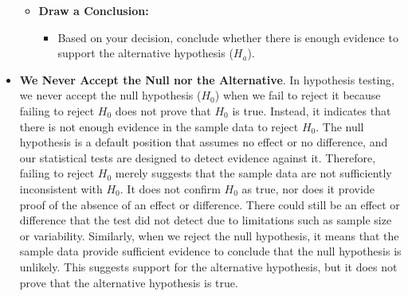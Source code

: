 \documentclass{article}
\begin{document}
\begin{itemize}
\begin{itemize}
    \item \textbf{Draw a Conclusion:}
    \begin{itemize}
        \item Based on your decision, conclude whether there is enough evidence to support the alternative hypothesis ($H_a$).
    \end{itemize}
\end{itemize}

\item \textbf{We Never Accept the Null nor the Alternative}. In hypothesis testing, we never accept the null hypothesis ($H_0$) when we fail to reject it because failing to reject $H_0$ does not prove that $H_0$ is true. Instead, it indicates that there is not enough evidence in the sample data to reject $H_0$. The null hypothesis is a default position that assumes no effect or no difference, and our statistical tests are designed to detect evidence against it. Therefore, failing to reject $H_0$ merely suggests that the sample data are not sufficiently inconsistent with $H_0$. It does not confirm $H_0$ as true, nor does it provide proof of the absence of an effect or difference. There could still be an effect or difference that the test did not detect due to limitations such as sample size or variability. Similarly, when we reject the null hypothesis, it means that the sample data provide sufficient evidence to conclude that the null hypothesis is unlikely. This suggests support for the alternative hypothesis, but it does not prove that the alternative hypothesis is true.



\end{itemize}
\end{document}
